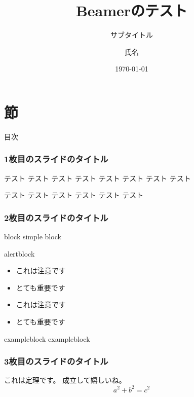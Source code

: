 \documentclass[aspectratio=169, dvipdfmx, hyperref={bookmarks=true}]{beamer}
\title[Beamer]{Beamerのテスト}
\subtitle{サブタイトル}
\author[Name]{氏名}
\institute[Affiliation]{所属}
\date{\today}
\begin{document}
\begin{frame}
\maketitle
\end{frame}

\section{節}

\begin{frame}{目次}
  \tableofcontents
\end{frame}

\begin{frame}
\frametitle{1枚目のスライドのタイトル}
テスト テスト テスト テスト テスト テスト テスト テスト

テスト テスト テスト テスト テスト テスト
\end{frame}

\begin{frame}
\frametitle{2枚目のスライドのタイトル}
  \begin{block}{block}
      simple block
    \end{block}
    \begin{alertblock}{alertblock}
      \begin{itemize}
        \item これは注意です
        \item とても重要です
      \end{itemize}
      \begin{itemize}
        \item これは注意です
        \item とても重要です
      \end{itemize}
    \end{alertblock}
    \begin{exampleblock}{exampleblock}
      exampleblock
    \end{exampleblock}
\end{frame}

\begin{frame}
  \frametitle{3枚目のスライドのタイトル}
  \begin{theorem}[定理の名前]
    これは定理です。
    成立して嬉しいね。
    \begin{equation}
      a^2 + b^2 = c^2
    \end{equation}
  \end{theorem}
\end{frame}
\end{document}
